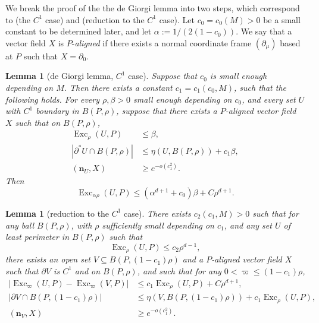 \documentclass[reqno,11pt]{amsart}
\DeclareMathOperator{\Exc}{Exc}
\newcommand{\normal}{\mathbf n}
\newcommand{\dfn}[1]{\emph{#1}\index{#1}}
\newtheorem{lemma}[theorem]{Lemma}
\theoremstyle{definition}
\numberwithin{equation}{section}
\begin{document}
We break the proof of the the de Giorgi lemma into two steps, which correspond to \cite[Lemma 6.4]{Giusti77} (the $C^1$ case) and \cite[Lemma 7.5]{Giusti77} (reduction to the $C^1$ case).
Let $c_0 = c_0(M) > 0$ be a small constant to be determined later, and let $\alpha := 1/(2(1 - c_0))$.
We say that a vector field $X$ is $P$-\dfn{aligned} if there exists a normal coordinate frame $(\partial_\mu)$ based at $P$ such that $X = \partial_0$.

\begin{lemma}[de Giorgi lemma, $C^1$ case]\label{Miranda44}
Suppose that $c_0$ is small enough depending on $M$.
Then there exists a constant $c_1 = c_1(c_0, M)$, such that the following holds.
For every $\rho, \beta > 0$ small enough depending on $c_0$, and every set $U$ with $C^1$ boundary in $B(P, \rho)$, suppose that there exists a $P$-aligned vector field $X$ such that on $B(P, \rho)$,
\begin{align}
\Exc_\rho(U, P) &\leq \beta, \label{Miranda44 induction hyp}\\
|\partial^* U \cap B(P, \rho)| &\leq \eta(U, B(P, \rho)) + c_1 \beta, \label{Miranda44 minimality hyp} \\
(\normal_U, X) &\geq e^{-o(c_1^2)}. \label{Miranda44 normal hyp}
\end{align}
Then
\begin{equation}\label{Miranda44 concl}
\Exc_{\alpha \rho} (U, P) \leq (\alpha^{d + 1} + c_0) \beta + C\rho^{d + 1}.
\end{equation}
\end{lemma}

\begin{lemma}[reduction to the $C^1$ case]\label{single mollify}
There exists $c_2(c_1, M) > 0$ such that for any ball $B(P, \rho)$, with $\rho$ sufficiently small depending on $c_1$, and any set $U$ of least perimeter in $B(P, \rho)$ such that
\begin{equation}\label{single mollify hyp}
\Exc_\rho (U, P) \leq c_2 \rho^{d - 1},
\end{equation}
there exists an open set $V \subseteq B(P, (1 - c_1)\rho)$ and a $P$-aligned vector field $X$ such that $\partial V$ is $C^1$ and on $B(P, \rho)$, and such that for any $0 < \varpi \leq (1 - c_1)\rho$,
\begin{align}
|\Exc_\varpi (U, P) - \Exc_\varpi (V, P)| &\leq c_1 \Exc_\rho (U, P) + C\rho^{d + 1}, \label{single mollify excess} \\
|\partial V \cap B(P, (1 - c_1)\rho)| &\leq \eta(V, B(P, (1 - c_1)\rho)) + c_1 \Exc_\rho (U, P), \label{single mollify minimality} \\
(\normal_V, X) &\geq e^{-o(c_1^2)}. \label{single mollify normal}
\end{align}
\end{lemma}
\end{document}
